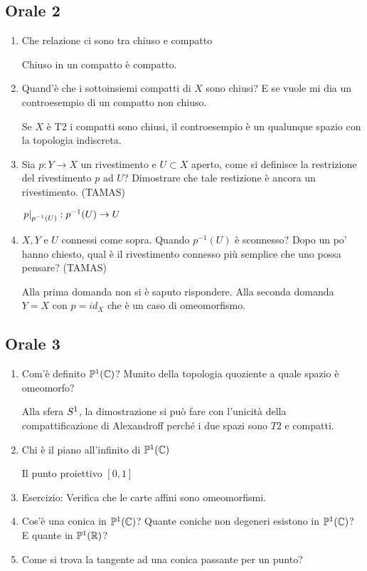 \documentclass[]{article}
\begin{document}
\subsection{Orale 2}
\begin{enumerate}
    \item Che relazione ci sono tra chiuso e compatto
        \begin{answer}
            Chiuso in un compatto \`e compatto.
        \end{answer}
    \item Quand'\`e che i sottoinsiemi compatti di $X$ sono chiusi? E se vuole mi dia un controesempio
        di un compatto non chiuso.
        \begin{answer}
            Se $X$ \`e T2 i compatti sono chiusi, il controesempio \`e un qualunque spazio con la topologia indiscreta.
        \end{answer}
    \item Sia $p: Y \to X$ un rivestimento e $U \subset X$ aperto, come si definisce la restrizione
        del rivestimento $p$ ad $U$? Dimostrare che tale restizione \`e ancora un rivestimento. (TAMAS)
        \begin{answer}
            $\left. p \right|_{p^{-1}(U)}: p^{-1}(U) \to U$
        \end{answer}
    \item $X,Y$ e $U$ connessi come sopra. Quando $p^{-1}(U)$ \`e sconnesso? Dopo un po' hanno chiesto, qual \`e il rivestimento
        connesso pi\`u semplice che uno possa pensare? (TAMAS)
        \begin{answer}
            Alla prima domanda non si \`e saputo rispondere. \nl
            Alla seconda domanda $Y = X$ con $p = id_X$ che \`e un caso di omeomorfismo.
        \end{answer}
\end{enumerate}

\subsection{Orale 3}
\begin{enumerate}
    \item Com'\`e definito $\mathbb{P}^{1}\!\left(\mathbb{C}\right)$? Munito della topologia quoziente a quale spazio \`e omeomorfo?
        \begin{answer}
            Alla sfera $S^{1}$, la dimostrazione si pu\`o fare con l'unicit\`a della compattificazione di Alexandroff perch\'e i due spazi sono $T2$ e compatti.
        \end{answer} 
    \item Chi \`e il piano all'infinito di $\mathbb{P}^{1}\!\left(\mathbb{C}\right)$
        \begin{answer}
            Il punto proiettivo $[0,1]$
        \end{answer}
    \item Esercizio: Verifica che le carte affini sono omeomorfismi.
    \item Cos'\`e una conica in $\mathbb{P}^{1}\!\left(\mathbb{C}\right)$? Quante coniche non degeneri esistono in $\mathbb{P}^{1}\!\left(\mathbb{C}\right)$? E quante in $\mathbb{P}^{1}\!\left(\mathbb{R}\right)$?
    \item Come si trova la tangente ad una conica passante per un punto?
\end{enumerate}
\end{document}
